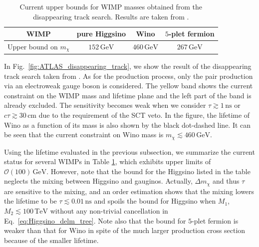 \documentclass[12pt,twoside,book]{article}
\begin{document}
\begin{table}[t]
  \centering
  \begin{tabular}{c|ccc}
    WIMP & pure Higgsino & Wino & $5$-plet fermion \\ \hline
    Upper bound on $m_\chi$ & $152\, \mathrm{GeV}$ & $460\, \mathrm{GeV}$
    & $267\, \mathrm{GeV}$
  \end{tabular}
  \caption{
    Current upper bounds for WIMP masses obtained from the disappearing track search.
    Results are taken from \cite{ATL-PHYS-PUB-2017-019, Aaboud:2017mpt, Sirunyan:2018ldc, Ostdiek:2015aga}.
  }
  \label{tab:disp_track_current}
\end{table}

In Fig.~\ref{fig:ATLAS_disappearing_track}, we show the result of the disappearing track search taken from \cite{Aaboud:2017mpt}.
As for the production process, only the pair production via an electroweak gauge boson is considered.
The yellow band shows the current constraint on the WIMP mass and lifetime plane and the left part of the band is already excluded.
The sensitivity becomes weak when we consider $\tau \gtrsim 1\, \mathrm{ns}$ or $c \tau \gtrsim 30\, \mathrm{cm}$ due to the requirement of the SCT veto.
In the figure, the lifetime of Wino as a function of its mass is also shown by the black dot-dashed line.
It can be seen that the current constraint on Wino mass is $m_\chi \lesssim 460\,\mathrm{GeV}$.

Using the lifetime evaluated in the previous subsection, we summarize the current status for several WIMPs in Table \ref{tab:disp_track_current}, which exhibits upper limits of $\mathcal{O} (100)\,\mathrm{GeV}$.
However, note that the bound for the Higgsino listed in the table neglects the mixing between Higgsino and gauginos.
Actually, $\Delta m_\chi$ and thus $\tau$ are sensitive to the mixing, and an order estimation shows that the mixing lowers the lifetime to be $\tau \lesssim 0.01\,\mathrm{ns}$ and spoils the bound for Higgsino when $M_1$, $M_2 \lesssim 100\,\mathrm{TeV}$ without any non-trivial cancellation in Eq.~\eqref{eq:Higgsino_delm_tree}.
Note also that the bound for $5$-plet fermion is weaker than that for Wino in spite of the much larger production cross section because of the smaller lifetime.
\end{document}
